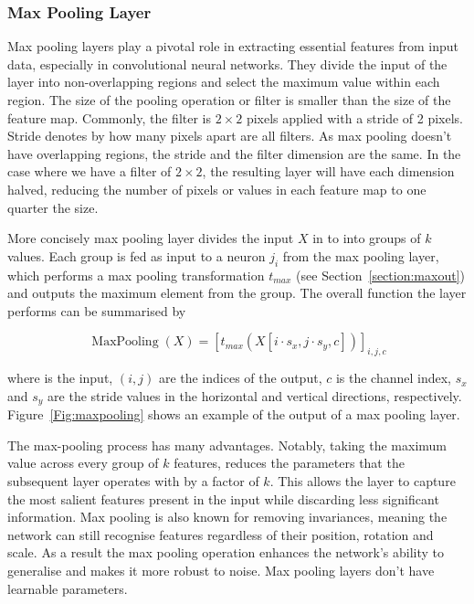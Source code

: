 \subsubsection{Max Pooling Layer}
\label{section:max}

Max pooling layers play a pivotal role in extracting essential features from input data, especially in convolutional neural networks. They divide the input of the layer into non-overlapping regions and select the maximum value within each region. The size of the pooling operation or filter is smaller than the size of the feature map. Commonly, the filter is $2\times 2$ pixels applied with a stride of 2 pixels. Stride denotes by how many pixels apart are all filters. As max pooling doesn't have overlapping regions, the stride and the filter dimension are the same. In the case where we have a filter of $2\times 2$, the resulting layer will have each dimension halved, reducing the number of pixels or values in each feature map to one quarter the size. 

More concisely max pooling layer divides the input $X$ in to into groups of $k$ values. Each group is fed as input to a neuron $j_i$ from the max pooling layer, which performs a max pooling transformation $t_{max}$ (see Section~\ref{section:maxout}) and outputs the maximum element from the group. The overall function the layer performs can be summarised by 

\begin{equation}
\operatorname{MaxPooling}(X)= [t_{max}(X[i \cdot s_x, j \cdot s_y, c])]_{i,j,c}
\label{eq:maxlayer}
\end{equation}

where is the input, $(i,j)$ are the indices of the output, $c$ is the channel index, $s_x$ and $s_y$ are the stride values in the horizontal and vertical directions, respectively. Figure~\ref{Fig:maxpooling} shows an example of the output of a max pooling layer.

The max-pooling process has many advantages. Notably, taking the maximum value across every group of $k$ features, reduces the parameters that the subsequent layer operates with by a factor of $k$. This allows the layer to capture the most salient features present in the input while discarding less significant information. Max pooling is also known for removing invariances, meaning the network can still recognise features regardless of their position, rotation and scale. As a result the max pooling operation enhances the network's ability to generalise and makes it more robust to noise. Max pooling layers don't have learnable parameters.

